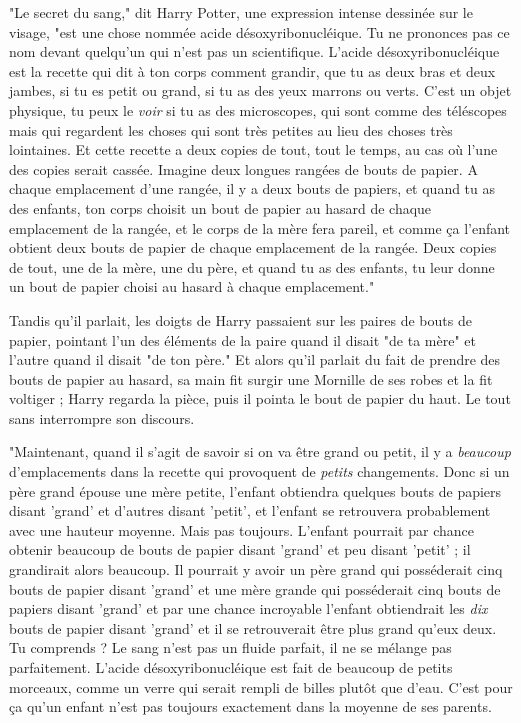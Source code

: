 "Le secret du sang," dit Harry Potter, une expression intense dessinée sur le visage, "est une chose nommée acide désoxyribonucléique. Tu ne prononces pas ce nom devant quelqu'un qui n'est pas un scientifique. L'acide désoxyribonucléique est la recette qui dit à ton corps comment grandir, que tu as deux bras et deux jambes, si tu es petit ou grand, si tu as des yeux marrons ou verts. C'est un objet physique, tu peux le \emph{voir}  si tu as des microscopes, qui sont comme des téléscopes mais qui regardent les choses qui sont très petites au lieu des choses très lointaines. Et cette recette a deux copies de tout, tout le temps, au cas où l'une des copies serait cassée. Imagine deux longues rangées de bouts de papier. A chaque emplacement d'une rangée, il y a deux bouts de papiers, et quand tu as des enfants, ton corps choisit un bout de papier au hasard de chaque emplacement de la rangée, et le corps de la mère fera pareil, et comme ça l'enfant obtient deux bouts de papier de chaque emplacement de la rangée. Deux copies de tout, une de la mère, une du père, et quand tu as des enfants, tu leur donne un bout de papier choisi au hasard à chaque emplacement."

Tandis qu'il parlait, les doigts de Harry passaient sur les paires de bouts de papier, pointant l'un des éléments de la paire quand il disait "de ta mère" et l'autre quand il disait "de ton père." Et alors qu'il parlait du fait de prendre des bouts de papier au hasard, sa main fit surgir une Mornille de ses robes et la fit voltiger ; Harry regarda la pièce, puis il pointa le bout de papier du haut. Le tout sans interrompre son discours.

"Maintenant, quand il s'agit de savoir si on va être grand ou petit, il y a \emph{beaucoup}  d'emplacements dans la recette qui provoquent de \emph{petits}  changements. Donc si un père grand épouse une mère petite, l'enfant obtiendra quelques bouts de papiers disant 'grand' et d'autres disant 'petit', et l'enfant se retrouvera probablement avec une hauteur moyenne. Mais pas toujours. L'enfant pourrait par chance obtenir beaucoup de bouts de papier disant 'grand' et peu disant 'petit' ; il grandirait alors beaucoup. Il pourrait y avoir un père grand qui posséderait cinq bouts de papier disant 'grand' et une mère grande qui posséderait cinq bouts de papiers disant 'grand' et par une chance incroyable l'enfant obtiendrait les \emph{dix}  bouts de papier disant 'grand' et il se retrouverait être plus grand qu'eux deux. Tu comprends ? Le sang n'est pas un fluide parfait, il ne se mélange pas parfaitement. L'acide désoxyribonucléique est fait de beaucoup de petits morceaux, comme un verre qui serait rempli de billes plutôt que d'eau. C'est pour ça qu'un enfant n'est pas toujours exactement dans la moyenne de ses parents.


